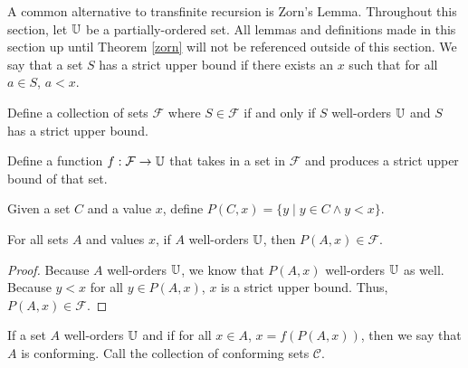 \documentclass[../../math.tex]{subfiles}
\begin{document}
A common alternative to transfinite recursion is Zorn's Lemma.  Throughout this
section, let $\mathbb{U}$ be a partially-ordered set.  All lemmas and definitions made
in this section up until Theorem \ref{zorn} will not be referenced outside of
this section.  We say that a set $S$ has a strict upper bound if there exists an
$x$ such that for all $a \in S$, $a < x$.

\begin{definition}
    Define a collection of sets $\mathcal F$ where $S \in \mathcal F$ if and
    only if $S$ well-orders $\mathbb{U}$ and $S$ has a strict upper bound.
\end{definition}

\begin{definition}
    Define a function $f : \mathcal F \rightarrow \mathbb{U}$ that takes in a set in
    $\mathcal F$ and produces a strict upper bound of that set.
\end{definition}

\begin{definition}
    Given a set $C$ and a value $x$, define $P(C, x) = \{y \mid y \in C \wedge y
    < x\}$.
\end{definition}

\begin{lemma}
    For all sets $A$ and values $x$, if $A$ well-orders $\mathbb{U}$, then $P(A, x) \in
    \mathcal F$.
\end{lemma}
\begin{proof}
    Because $A$ well-orders $\mathbb{U}$, we know that $P(A, x)$ well-orders $\mathbb{U}$ as
    well.  Because $y < x$ for all $y \in P(A, x)$, $x$ is a strict upper bound.
    Thus, $P(A, x) \in \mathcal F$.
\end{proof}

\begin{definition}
    If a set $A$ well-orders $\mathbb{U}$ and if for all $x \in A$, $x = f(P(A, x))$,
    then we say that $A$ is conforming.  Call the collection of conforming sets
    $\mathcal C$.
\end{definition}
\end{document}
